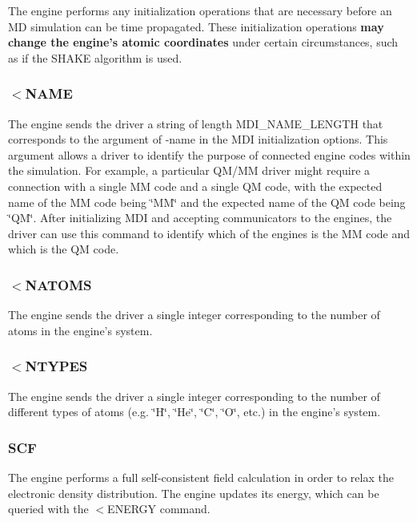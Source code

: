 The engine performs any initialization operations that are necessary before an M\-D simulation can be time propagated. These initialization operations {\bfseries  may change the engine's atomic coordinates } under certain circumstances, such as if the S\-H\-A\-K\-E algorithm is used.\hypertarget{index_send_name}{}\subsubsection{$<$\-N\-A\-M\-E}\label{index_send_name}
The engine sends the driver a string of length {\ttfamily M\-D\-I\-\_\-\-N\-A\-M\-E\-\_\-\-L\-E\-N\-G\-T\-H} that corresponds to the argument of {\ttfamily -\/name} in the M\-D\-I initialization options. This argument allows a driver to identify the purpose of connected engine codes within the simulation. For example, a particular Q\-M/\-M\-M driver might require a connection with a single M\-M code and a single Q\-M code, with the expected name of the M\-M code being \char`\"{}\-M\-M\char`\"{} and the expected name of the Q\-M code being \char`\"{}\-Q\-M\char`\"{}. After initializing M\-D\-I and accepting communicators to the engines, the driver can use this command to identify which of the engines is the M\-M code and which is the Q\-M code.\hypertarget{index_recv_natoms}{}\subsubsection{$<$\-N\-A\-T\-O\-M\-S}\label{index_recv_natoms}
The engine sends the driver a single integer corresponding to the number of atoms in the engine's system.\hypertarget{index_recv_types}{}\subsubsection{$<$\-N\-T\-Y\-P\-E\-S}\label{index_recv_types}
The engine sends the driver a single integer corresponding to the number of different types of atoms (e.\-g. \char`\"{}\-H\char`\"{}, \char`\"{}\-He\char`\"{}, \char`\"{}\-C\char`\"{}, \char`\"{}\-O\char`\"{}, etc.) in the engine's system.\hypertarget{index_scf_command}{}\subsubsection{S\-C\-F}\label{index_scf_command}
The engine performs a full self-\/consistent field calculation in order to relax the electronic density distribution. The engine updates its energy, which can be queried with the {\ttfamily $<$E\-N\-E\-R\-G\-Y} command. 